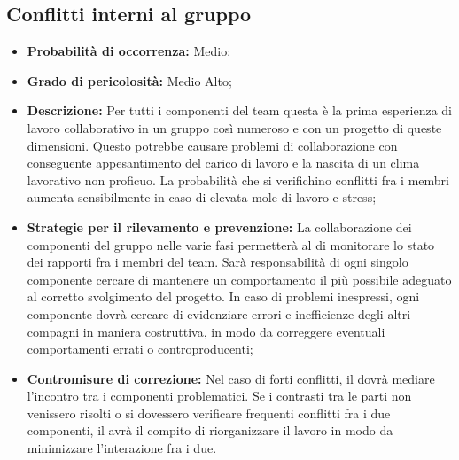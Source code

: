 \subsection{Conflitti interni al gruppo}
\begin{itemize}
\item \textbf{Probabilità di occorrenza:} Medio;
\item \textbf{Grado di pericolosità:} Medio Alto;
\item \textbf{Descrizione:} Per tutti i componenti del team questa è la prima esperienza di lavoro collaborativo in un gruppo così numeroso e con un progetto di queste dimensioni. Questo potrebbe causare problemi di collaborazione con conseguente appesantimento del carico di lavoro e la nascita di un clima lavorativo non proficuo. La probabilità che si verifichino conflitti fra i membri aumenta sensibilmente in caso di elevata mole di lavoro e stress;

\item \textbf{Strategie per il rilevamento e prevenzione:} La collaborazione dei componenti del gruppo nelle varie fasi permetterà al \ruoloResponsabile di monitorare lo stato dei rapporti fra i membri del team. Sarà responsabilità di ogni singolo componente cercare di mantenere un comportamento il più possibile adeguato al corretto svolgimento del progetto. In caso di problemi inespressi, ogni componente dovrà cercare di evidenziare errori e inefficienze degli altri compagni in maniera costruttiva, in modo da correggere eventuali comportamenti errati o controproducenti;

\item \textbf{Contromisure di correzione:} Nel caso di forti conflitti, il \ruoloResponsabile dovrà mediare l'incontro tra i componenti problematici. Se i contrasti tra le parti non venissero risolti o si dovessero verificare frequenti conflitti fra i due componenti, il \ruoloResponsabile avrà il compito di riorganizzare il lavoro in modo da minimizzare l'interazione fra i due.
\end{itemize}

